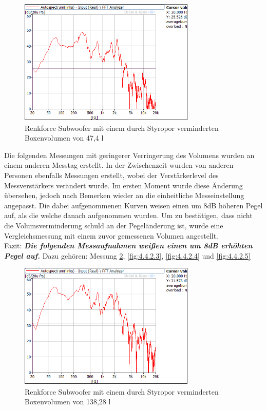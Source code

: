 \begin{figure} [H]
\centering
\includegraphics[width=0.75\textwidth]{img/Optimierung/Sub/RenkforceStyro_47l.png}
\caption{Renkforce Subwoofer mit einem durch Styropor verminderten Boxenvolumen von 47,4 l}
\label{fig:4.4.2.1}
\end{figure}

Die folgenden Messungen mit geringerer Verringerung des Volumens wurden an einem anderen Messtag erstellt.
In der Zwischenzeit wurden von anderen Personen ebenfalls Messungen erstellt, wobei der Verstärkerlevel des Messverstärkers verändert wurde.
Im ersten Moment wurde diese Änderung übersehen, jedoch nach Bemerken wieder an die einheitliche Messeinstellung angepasst.
Die dabei aufgenommenen Kurven weisen einen um 8dB höheren Pegel auf, als die welche danach aufgenommen wurden.
Um zu bestätigen, dass nicht die Volumsverminderung schuld an der Pegeländerung ist, wurde eine Vergleichsmessung mit einem zuvor gemessenen Volumen angestellt.\\

Fazit:\textit{\textbf{ Die folgenden Messaufnahmen weißen einen um 8dB erhöhten Pegel auf.}}
Dazu gehören: Messung \ref{fig:4.4.2.2}, \ref{fig:4.4.2.3}, \ref{fig:4.4.2.4} und \ref{fig:4.4.2.5}

\begin{figure} [H]
\centering
\includegraphics[width=0.75\textwidth]{img/Optimierung/Sub/RenkforceStyro_138l.png}
\caption{Renkforce Subwoofer mit einem durch Styropor verminderten Boxenvolumen von 138,28 l}
\label{fig:4.4.2.2}
\end{figure}

